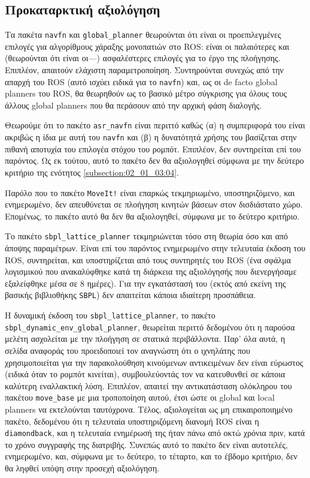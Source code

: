 \subsection{Προκαταρκτική αξιολόγηση}
  \label{subsection:02_01_04:01}

Τα πακέτα \texttt{navfn} και \texttt{global\_planner} θεωρούνται ότι είναι οι
προεπιλεγμένες επιλογές για αλγορίθμους χάραξης μονοπατιών στο ROS: είναι οι
παλαιότερες και (θεωρούνται ότι είναι οι---) ασφαλέστερες επιλογές για το έργο
της πλοήγησης. Επιπλέον, απαιτούν ελάχιστη παραμετροποίηση. Συντηρούνται συνεχώς
από την απαρχή του ROS (αυτό ισχύει ειδικά για το \texttt{navfn}) και,
ως οι de facto global planners του ROS, θα θεωρηθούν ως το βασικό μέτρο
σύγκρισης για όλους τους άλλους global planners που θα περάσουν από την αρχική
φάση διαλογής.

Θεωρούμε ότι το πακέτο \texttt{asr\_navfn} είναι περιττό καθώς (α) η
συμπεριφορά του είναι ακριβώς η ίδια με αυτή του \texttt{navfn} και (β) η
δυνατότητά χρήσης του βασίζεται στην πιθανή αποτυχία του επιλογέα στόχου του
ρομπότ. Επιπλέον, δεν συντηρείται επί του παρόντος. Ως εκ τούτου, αυτό το
πακέτο δεν θα αξιολογηθεί σύμφωνα με την δεύτερο κριτήριο της ενότητος
\ref{subsection:02_01_03:04}.

Παρόλο που το πακέτο \texttt{MoveIt!} είναι επαρκώς τεκμηριωμένο,
υποστηριζόμενο, και ενημερωμένο, δεν απευθύνεται σε πλοήγηση κινητών βάσεων
στον δισδιάστατο χώρο. Επομένως, το πακέτο αυτό θα δεν θα αξιολογηθεί, σύμφωνα
με το δεύτερο κριτήριο.

Το πακέτο \texttt{sbpl\_lattice\_planner} τεκμηριώνεται τόσο στη θεωρία όσο και
από άποψης παραμέτρων. Είναι επί του παρόντος ενημερωμένο στην τελευταία έκδοση
του ROS, συντηρείται, και υποστηρίζεται από τους συντηρητές του ROS (ένα σφάλμα
λογισμικού που ανακαλύφθηκε κατά τη διάρκεια της αξιολόγησής που διενεργήσαμε
εξαλείφθηκε μέσα σε $8$ ημέρες). Για την εγκατάστασή του (εκτός από εκείνη της
βασικής βιβλιοθήκης \texttt{SBPL}) δεν απαιτείται κάποια ιδιαίτερη προσπάθεια.

Η δυναμική έκδοση του \texttt{sbpl\_lattice\_planner}, το πακέτο
\texttt{sbpl\_dynamic\_env\_global\_planner}, θεωρείται περιττό δεδομένου ότι η
παρούσα μελέτη ασχολείται με την πλοήγηση σε στατικά περιβάλλοντα.  Παρ' όλα
αυτά, η σελίδα αναφοράς του προειδοποιεί τον αναγνώστη ότι ο ιχνηλάτης που
χρησιμοποιείται για την παρακολούθηση κινούμενων αντικειμένων δεν είναι
εύρωστος (ειδικά όταν το ρομπότ κινείται), συμβουλεύοντάς τον να κατευθυνθεί σε
κάποια καλύτερη εναλλακτική λύση. Επιπλέον, απαιτεί την αντικατάσταση ολόκληρου
του πακέτου \texttt{move\_base} με μια τροποποίηση αυτού, έτσι ώστε οι global
και local planners να εκτελούνται ταυτόχρονα. Τέλος, αξιολογείται ως μη
επικαιροποιημένο πακέτο, δεδομένου ότι η τελευταία υποστηριζόμενη διανομή ROS
είναι η \texttt{diamondback}, και η τελευταία ενημέρωσή της ήταν πάνω από οκτώ
χρόνια πριν, κατά το χρόνο συγγραφής της διατριβής. Συνεπώς αυτό το πακέτο δεν
είναι αυτοτελές, ενημερωμένο, και, σύμφωνα με τo δεύτερο, το τέταρτο, και το
έβδομο κριτήριο, δεν θα ληφθεί υπόψη στην προσεχή αξιολόγηση.

